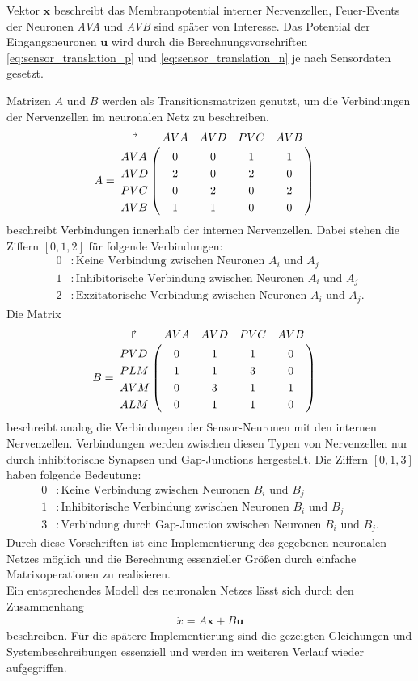 	Vektor $\boldsymbol{x}$ beschreibt das Membranpotential interner Nervenzellen, Feuer-Events der Neuronen \textit{AVA} und \textit{AVB} sind später von Interesse. Das Potential der Eingangsneuronen $\boldsymbol{u}$ wird durch die Berechnungsvorschriften \eqref{eq:sensor_translation_p} und \eqref{eq:sensor_translation_n} je nach Sensordaten gesetzt.
	
	Matrizen $A$ und $B$ werden als Transitionsmatrizen genutzt, um die Verbindungen der Nervenzellen im neuronalen Netz zu beschreiben.
	\begin{align}
		\label{eq:mat_A}
		A &= \bordermatrix{
		\quad\Rsh& AVA & AVD & PVC & AVB \cr
			AVA &  0  &  0  &  1  &  1  \cr
			AVD &  2  &  0  &  2  &  0  \cr
			PVC &  0  &  2  &  0  &  2  \cr
			AVB &  1  &  1  &  0  &  0  \cr
		}
	\end{align}
	beschreibt Verbindungen innerhalb der internen Nervenzellen. Dabei stehen die Ziffern $[0,1,2]$ für folgende Verbindungen:
	\begin{align*}
		0 &: \text{Keine Verbindung zwischen Neuronen }A_i\text{ und } A_j\\
		1 &: \text{Inhibitorische Verbindung zwischen Neuronen }A_i\text{ und }A_j\\
		2 &: \text{Exzitatorische Verbindung zwischen Neuronen }A_i\text{ und }A_j.
	\end{align*}
	Die Matrix
	\begin{align}
		\label{eq:mat_B}
		B &= \bordermatrix{
		\quad\Rsh& AVA & AVD & PVC & AVB \cr
			PVD &  0  &  1  &  1  &  0  \cr
			PLM &  1  &  1  &  3  &  0  \cr
			AVM &  0  &  3  &  1  &  1  \cr
			ALM &  0  &  1  &  1  &  0  \cr
		}
	\end{align}
	beschreibt analog die Verbindungen der Sensor-Neuronen mit den internen Nervenzellen. Verbindungen werden zwischen diesen Typen von Nervenzellen nur durch inhibitorische Synapsen und Gap-Junctions hergestellt. Die Ziffern $[0,1,3]$ haben folgende Bedeutung:
	\begin{align*}
		0 &: \text{Keine Verbindung zwischen Neuronen }B_i\text{ und } B_j\\
		1 &: \text{Inhibitorische Verbindung zwischen Neuronen }B_i\text{ und }B_j\\
		3 &: \text{Verbindung durch Gap-Junction zwischen Neuronen }B_i\text{ und }B_j.
	\end{align*}
	Durch diese Vorschriften ist eine Implementierung des gegebenen neuronalen Netzes möglich und die Berechnung essenzieller Größen durch einfache Matrixoperationen zu realisieren.\\
	Ein entsprechendes Modell des neuronalen Netzes lässt sich durch den Zusammenhang
	\begin{align}
		\dot{x} = A\boldsymbol{x} + B\boldsymbol{u}
	\end{align}
	beschreiben. Für die spätere Implementierung sind die gezeigten Gleichungen und Systembeschreibungen essenziell und werden im weiteren Verlauf wieder aufgegriffen.


